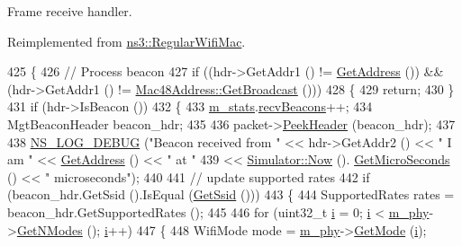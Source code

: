 Frame receive handler. 



Reimplemented from \hyperlink{classns3_1_1RegularWifiMac_a9abbbcea65b6dc416ab1b44785c40e9f}{ns3\+::\+Regular\+Wifi\+Mac}.


\begin{DoxyCode}
425 \{
426   \textcolor{comment}{// Process beacon}
427   \textcolor{keywordflow}{if} ((hdr->GetAddr1 () != \hyperlink{classns3_1_1RegularWifiMac_aea719a7d05fbc664c50479fc900777b7}{GetAddress} ()) && (hdr->GetAddr1 () != 
      \hyperlink{classns3_1_1Mac48Address_a55156e302c6bf950c0b558365adbde84}{Mac48Address::GetBroadcast} ()))
428     \{
429       \textcolor{keywordflow}{return};
430     \}
431   \textcolor{keywordflow}{if} (hdr->IsBeacon ())
432     \{
433       \hyperlink{classns3_1_1MeshWifiInterfaceMac_a3707a5a7f4893aabbbf02b7e95e411c8}{m\_stats}.\hyperlink{structns3_1_1MeshWifiInterfaceMac_1_1Statistics_ae9d9c10ed7681fe6ae3dd127ad6d5788}{recvBeacons}++;
434       MgtBeaconHeader beacon\_hdr;
435 
436       packet->\hyperlink{classns3_1_1Packet_aadc63487bea70945c418f4c3e9b81964}{PeekHeader} (beacon\_hdr);
437 
438       \hyperlink{group__logging_ga413f1886406d49f59a6a0a89b77b4d0a}{NS\_LOG\_DEBUG} (\textcolor{stringliteral}{"Beacon received from "} << hdr->GetAddr2 () << \textcolor{stringliteral}{" I am "} << 
      \hyperlink{classns3_1_1RegularWifiMac_aea719a7d05fbc664c50479fc900777b7}{GetAddress} () << \textcolor{stringliteral}{" at "}
439                                             << \hyperlink{classns3_1_1Simulator_ac3178fa975b419f7875e7105be122800}{Simulator::Now} ().
      \hyperlink{classns3_1_1Time_a2542b9273c336da11fcaf54e8bc6e4c8}{GetMicroSeconds} () << \textcolor{stringliteral}{" microseconds"});
440 
441       \textcolor{comment}{// update supported rates}
442       \textcolor{keywordflow}{if} (beacon\_hdr.GetSsid ().IsEqual (\hyperlink{classns3_1_1RegularWifiMac_a3cd4316ccd72111fa94f7091d4deb521}{GetSsid} ()))
443         \{
444           SupportedRates rates = beacon\_hdr.GetSupportedRates ();
445 
446           \textcolor{keywordflow}{for} (uint32\_t \hyperlink{bernuolliDistribution_8m_a6f6ccfcf58b31cb6412107d9d5281426}{i} = 0; \hyperlink{bernuolliDistribution_8m_a6f6ccfcf58b31cb6412107d9d5281426}{i} < \hyperlink{classns3_1_1RegularWifiMac_a1a6dad8eb0a057a4e1b459f518457a4c}{m\_phy}->\hyperlink{classns3_1_1WifiPhy_a2467e56b69d64bb2d648302f39397317}{GetNModes} (); \hyperlink{bernuolliDistribution_8m_a6f6ccfcf58b31cb6412107d9d5281426}{i}++)
447             \{
448               WifiMode mode = \hyperlink{classns3_1_1RegularWifiMac_a1a6dad8eb0a057a4e1b459f518457a4c}{m\_phy}->\hyperlink{classns3_1_1WifiPhy_ac35983a13a769a7fbaac43340b8cdaf2}{GetMode} (\hyperlink{bernuolliDistribution_8m_a6f6ccfcf58b31cb6412107d9d5281426}{i});

\end{DoxyCode}
